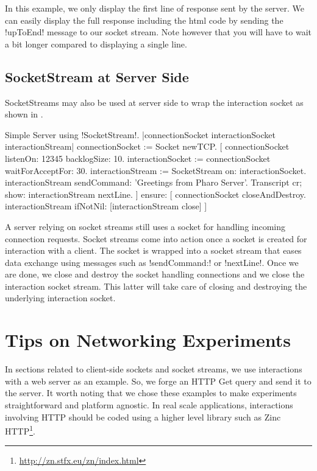 \documentclass[a4paper,10pt,twoside]{book}
\begin{document}
In this example, we only display the first line of response sent by the server.
We can easily display the full response including the html code by sending the \ct!upToEnd! message to our socket stream.
Note however that you will have to wait a bit longer compared to displaying a single line.

\subsection{SocketStream at Server Side}
SocketStreams may also be used at server side to wrap the interaction socket as shown in .

\begin{script}{Simple Server using \ct!SocketStream!.}
|connectionSocket interactionSocket interactionStream|
connectionSocket := Socket newTCP. 
[
	connectionSocket listenOn: 12345 backlogSize: 10. 
	interactionSocket := connectionSocket waitForAcceptFor: 30. 
	interactionStream := SocketStream on: interactionSocket.
	interactionStream sendCommand: 'Greetings from Pharo Server'.
	Transcript cr; show: interactionStream nextLine.
] ensure: [
	connectionSocket closeAndDestroy.
	interactionStream ifNotNil: [interactionStream close]
]
\end{script}

A server relying on socket streams still uses a socket for handling incoming connection requests.
Socket streams come into action once a socket is created for interaction with a client.
The socket is wrapped into a socket stream that eases data exchange using messages such as \ct!sendCommand:! or \ct!nextLine!.
Once we are done, we close and destroy the socket handling connections and we close the interaction socket stream.
This latter will take care of closing and destroying the underlying interaction socket.

\section{Tips on Networking Experiments}
In sections related to client-side sockets and socket streams, we use interactions with a web server as an example.
So, we forge an HTTP Get query and send it to the server.
It worth noting that we chose these examples to make experiments straightforward and platform agnostic.
In real scale applications, interactions involving HTTP should be coded using a higher level library such as Zinc HTTP\footnote{\url{http://zn.stfx.eu/zn/index.html}}.
\end{document}

